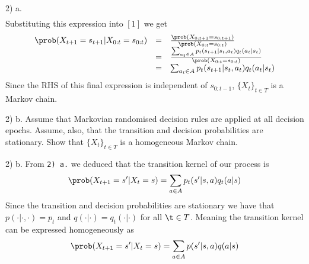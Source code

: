 \documentclass[11pt,a4paper]{article}
\begin{document}
\begin{answer}{2) a.}
\[\begin{array}{rl}
  \end{array}\]
  Substituting this expression into $[1]$ we get
  \[\begin{array}{rcl}
    \prob(X_{t+1}=s_{t+1}|X_{0:t}=s_{0:t})&=&\frac{\prob(X_{0:t+1}=s_{0:t+1})}{\prob(X_{0:t}=s_{0:t})}\\
    &=&\frac{\sum_{a_t\in A}p_t(s_{t+1}|s_t,a_t)q_t(a_t|s_t)}{\prob(X_{0:t}=s_{0:t})}\\
    &=&\sum_{a_t\in A}p_t(s_{t+1}|s_t,a_t)q_t(a_t|s_t)
  \end{array}\]
  Since the RHS of this final expression is independent of $s_{0:t-1}$, $\{X_t\}_{t\in T}$ is a Markov chain.
\end{answer}

\begin{question}{2) b.}
  Assume that Markovian randomised  decision rules are applied at all decision epochs. Assume, also, that the transition and decision probabilities are stationary. Show that $\{X_t\}_{t\in T}$ is a homogeneous Markov chain.
\end{question}

\begin{answer}{2) b.}
  From \texttt{2) a.} we deduced that the transition kernel of our process is
  \[ \prob(X_{t+1}=s'|X_t=s)=\sum_{a\in A}p_t(s'|s,a)q_t(a|s) \]
  Since the transition and decision probabilities are stationary we have that $p(\cdot|\cdot,\cdot)=p_t$ and $q(\cdot|\cdot)=q_t(\cdot|\cdot)$ for all $\t\in T$. Meaning the transition kernel can be expressed homogeneously as
  \[ \prob(X_{t+1}=s'|X_t=s)=\sum_{a\in A}p(s'|s,a)q(a|s) \]
\end{answer}
\end{document}
